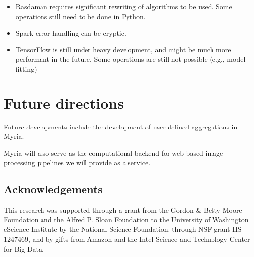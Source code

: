 \documentclass[a0,landscape]{a0poster}
\begin{document}
\begin{multicols}{3}
\begin{itemize}
\item Rasdaman requires significant rewriting of algorithms to be used. Some operations still need to be done in Python.

\item  Spark error handling can be cryptic.

\item TensorFlow is still under heavy development, and might be much more performant in the future. Some operations are still not possible (e.g., model fitting)

\end{itemize}

\color{DarkSlateGray} %


\section*{Future directions}

Future developments include the development of user-defined aggregations in Myria.

Myria will also serve as the computational backend for web-based image processing pipelines we will provide as a service.


\nocite{*} %
\footnotesize  %

\subsection*{Acknowledgements}
\footnotesize
This research was supported through a grant from the Gordon \& Betty Moore
Foundation and the Alfred P. Sloan Foundation to the University of Washington
eScience Institute by the National Science Foundation, through NSF grant
IIS-1247469, and by gifts from Amazon and the Intel Science and Technology
Center for Big Data.


\end{multicols}
\end{document}
